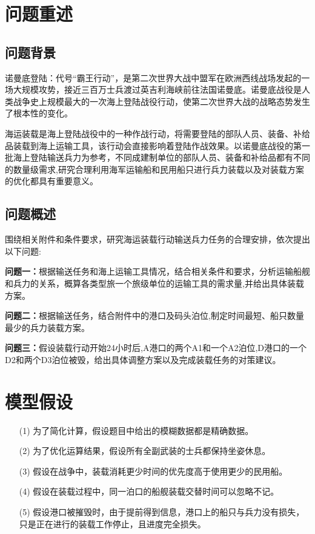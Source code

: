 \documentclass{whutmod}
\begin{document}
	\tableofcontents
	\newpage	%
	
	\section{问题重述}	
	\subsection{问题背景}
    诺曼底登陆：代号“霸王行动”，是第二次世界大战中盟军在欧洲西线战场发起的一场大规模攻势，接近三百万士兵渡过英吉利海峡前往法国诺曼底。诺曼底战役是人类战争史上规模最大的一次海上登陆战役行动，使第二次世界大战的战略态势发生了根本性的变化。
    
    海运装载是海上登陆战役中的一种作战行动，将需要登陆的部队人员、装备、补给品装载到海上运输工具，该行动会直接影响着登陆作战效果。以诺曼底战役的第一批海上登陆输送兵力为参考，不同成建制单位的部队人员、装备和补给品都有不同的数量级需求,研究合理利用海军运输船和民用船只进行兵力装载以及对装载方案的优化都具有重要意义。
    
    
    

	\subsection{问题概述}
    围绕相关附件和条件要求，研究海运装载行动输送兵力任务的合理安排，依次提出以下问题:
		 
	
	\textbf{问题一：}根据输送任务和海上运输工具情况，结合相关条件和要求，分析运输船舰和兵力的关系，概算各类型旅一个旅级单位的运输工具的需求量,并给出具体装载方案。
	
	\textbf{问题二：}根据输送任务，结合附件中的港口及码头泊位,制定时间最短、船只数量最少的兵力装载方案。
	
	\textbf{问题三：}假设装载行动开始24小时后,A港口的两个A1和一个A2泊位,D港口的一个D2和两个D3泊位被毁，给出具体调整方案以及完成装载任务的对策建议。
	
	
	\section{模型假设}
	\begin{itemize}                                             
		\item [(1)] 为了简化计算，假设题目中给出的模糊数据都是精确数据。
		\item [(2)] 为了优化运算结果，假设所有全副武装的士兵都保持坐姿休息。
		\item [(3)] 假设在战争中，装载消耗更少时间的优先度高于使用更少的民用船。
		\item [(4)] 假设在装载过程中，同一泊口的船舰装载交替时间可以忽略不记。
		\item [(5)] 假设港口被摧毁时，由于提前得到信息，港口上的船只与兵力没有损失，只是正在进行的装载工作停止，且进度完全损失。
	\end{itemize}
	
\end{document}
